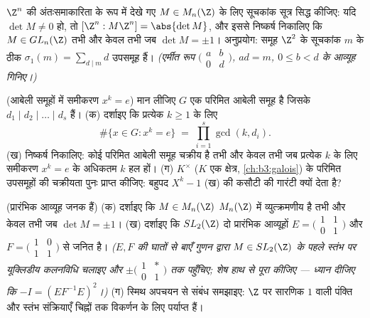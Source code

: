 \begin{exercise}[$\star\star\star$]\label{exo:b3:modules:10}
$\Z^n$ की अंतःसमाकारिता के रूप में देखे गए $M \in M_n(\Z)$ के लिए सूचकांक
सूत्र सिद्ध कीजिए: यदि $\det M \ne 0$ हो, तो $[\Z^n : M\Z^n] = \abs{\det M}$, और इससे निष्कर्ष
निकालिए कि $M \in GL_n(\Z)$ तभी और केवल तभी जब $\det M = \pm 1$। अनुप्रयोग: समूह
$\Z^2$ के सूचकांक $m$ के ठीक $\sigma_1(m) = \sum_{d \mid m} d$ उपसमूह हैं। \emph{(एर्मीत
रूप $\bigl(\begin{smallmatrix}
a & b\\ 0 & d\end{smallmatrix}\bigr)$, $ad = m$, $0 \leq b <
d$ के आव्यूह गिनिए।)}
\end{exercise}

\begin{exercise}[$\star\star$]\label{exo:b3:modules:11}
(आबेली समूहों में समीकरण $x^k = e$) मान लीजिए $G$ एक परिमित आबेली
समूह है जिसके  $d_1 \mid d_2 \mid \dots
\mid d_s$ हैं।
(क) दर्शाइए कि प्रत्येक $k \geq 1$ के लिए
\[
\#\{x \in G : x^k = e\} \;=\; \prod_{i=1}^{s}\gcd(k, d_i) .
\]
(ख) निष्कर्ष निकालिए: कोई परिमित आबेली समूह चक्रीय है तभी और
केवल तभी जब प्रत्येक $k$ के लिए समीकरण $x^k = e$ के अधिकतम $k$
हल हों।
(ग) $K^\times$ ($K$ एक क्षेत्र, \cref{ch:b3:galois}) के परिमित उपसमूहों की
चक्रीयता पुनः प्राप्त कीजिए: बहुपद $X^k - 1$ (ख) की कसौटी की गारंटी
क्यों देता है?
\end{exercise}

\begin{exercise}[$\star\star\star$]\label{exo:b3:modules:12}
(प्रारंभिक आव्यूह जनक हैं) (क) दर्शाइए कि $M \in M_n(\Z)$ $M_n(\Z)$ में
व्युत्क्रमणीय है तभी और केवल तभी जब $\det M = \pm1$।
(ख) दर्शाइए कि $SL_2(\Z)$ दो प्रारंभिक आव्यूहों
$E = \bigl(\begin{smallmatrix}1 & 1\\ 0 &
1\end{smallmatrix}\bigr)$ और
$F = \bigl(\begin{smallmatrix}1 & 0\\ 1 &
1\end{smallmatrix}\bigr)$
से जनित है।
\emph{($E, F$ की घातों से बाएँ गुणन द्वारा $M
\in SL_2(\Z)$ के पहले स्तंभ पर
यूक्लिडीय कलनविधि चलाइए और $\pm\bigl(\begin{smallmatrix}1 & *\\ 0 &
1\end{smallmatrix}\bigr)$ तक पहुँचिए; शेष हाथ से पूरा
कीजिए --- ध्यान दीजिए कि $-I = (EF^{-1}E)^2$।)}
(ग) स्मिथ अपचयन से संबंध समझाइए: $\Z$ पर सारणिक $1$ वाली
पंक्ति और स्तंभ संक्रियाएँ चिह्नों तक विकर्णन के लिए पर्याप्त
हैं।
\end{exercise}

